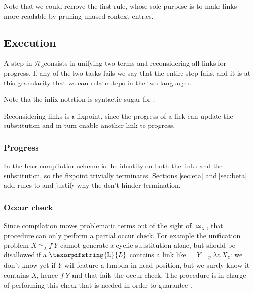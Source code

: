 \documentclass[sigconf,natbib=false,review]{acmart}
\newcommand{\UnifRel}{\ensuremath{\simeq}}
\newcommand{\Ue}{\ensuremath{\UnifRel_\lambda}\xspace}
\newcommand{\Ho}{\texorpdfstring{\ensuremath{\mathcal{H}_o}\xspace}{Ho}}
\newcommand{\linketaM}[3]{\ensuremath{#1 \vdash #2 =_\eta #3}}
\newcommand{\linkStore}{\texorpdfstring{\ensuremath{\mathbb{L}}\xspace}{L}}
\begin{document}


\noindent
Note that we could remove the first rule, whose sole purpose is to make
links more readable by pruning unused context entries.

\subsection{Execution}
\label{sec:execution}

A step in \Ho consists in unifying two terms and reconsidering all
links for progress. If any of the two tasks fails we say that the entire step
fails, and it is at this granularity that we can relate steps in the
two languages.




\noindent
Note tha the infix notation \elpiIn{((A ~\Ue~B) C D)} is syntactic sugar for
\elpiIn{((~\Ue\!\!\!~) A B C D)}.

Reconsidering links is a fixpoint, since the progress of a link can update the
substitution and in turn enable another link to progress.



\subsubsection{Progress}
In the base compilation scheme  is the identity
on both the links and the substitution, so the fixpoint trivially terminates.
Sections \ref{sec:eta} and \ref{sec:beta} add rules to 
and justify why the don't hinder termination.

\subsubsection{Occur check}\label{sec:oc}
Since compilation moves problematic terms out of the sight of \Ue{},
that procedure can only perform a partial occur check. For example the
unification problem $X \Ue f~Y$ cannot generate a cyclic substitution alone,
but should be disallowed if a $\linkStore$ contains a link like
$\linketaM{}{Y}{\lambda z.X_z}$: we don't know yet if $Y$ will feature
a lambda in head position, but we surely know it contains $X$, hence
$f~Y$ and that fails the occur check.
The procedure  is in charge of
performing this check that is needed in order to
guarantee .
\end{document}
